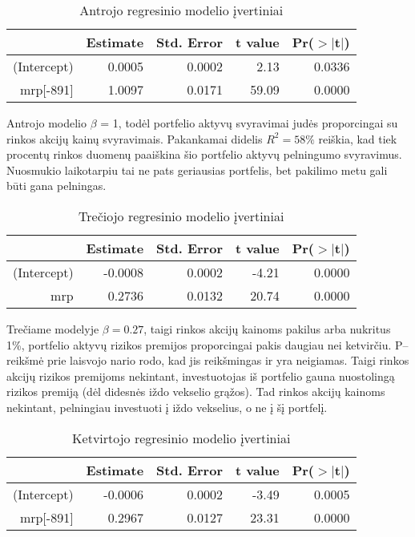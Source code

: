 \documentclass[12pt, a14paper, lithuanian]{article}
\begin{document}
\begin{table}[ht]
\begin{center}
\begin{tabular}{rrrrr}
\hline
& Estimate & Std. Error & t value & Pr($>$$|$t$|$) \\
\hline
(Intercept) & 0.0005 & 0.0002 & 2.13 & 0.0336 \\
mrp[-891] & 1.0097 & 0.0171 & 59.09 & 0.0000 \\
\hline
\end{tabular}
\end{center}
\caption{Antrojo regresinio modelio įvertiniai}
\end{table}

Antrojo modelio $\beta$ = 1, todėl portfelio aktyvų svyravimai judės proporcingai su rinkos akcijų kainų svyravimais.
Pakankamai didelis $R^2=58\%$ reiškia, kad tiek procentų rinkos duomenų paaiškina šio portfelio aktyvų pelningumo
svyravimus. Nuosmukio laikotarpiu tai ne pats geriausias portfelis, bet pakilimo metu gali būti gana pelningas.



\begin{table}[ht]
\begin{center}
\begin{tabular}{rrrrr}
\hline
& Estimate & Std. Error & t value & Pr($>$$|$t$|$) \\
\hline
(Intercept) & -0.0008 & 0.0002 & -4.21 & 0.0000 \\
mrp & 0.2736 & 0.0132 & 20.74 & 0.0000 \\
\hline
\end{tabular}
\end{center}
\caption{Trečiojo regresinio modelio įvertiniai}
\end{table}

Trečiame modelyje $\beta=0.27$, taigi rinkos akcijų kainoms pakilus arba nukritus 1\%, portfelio aktyvų rizikos premijos
proporcingai pakis daugiau nei ketvirčiu. P--reikšmė prie laisvojo nario rodo, kad jis reikšmingas ir yra 
neigiamas. Taigi rinkos akcijų rizikos premijoms nekintant, investuotojas iš portfelio gauna
nuostolingą rizikos premiją (dėl didesnės iždo vekselio grąžos). Tad rinkos akcijų kainoms nekintant,
pelningiau investuoti į iždo vekselius, o ne į šį portfelį.



\begin{table}[ht]
\begin{center}
\begin{tabular}{rrrrr}
\hline
& Estimate & Std. Error & t value & Pr($>$$|$t$|$) \\
\hline
(Intercept) & -0.0006 & 0.0002 & -3.49 & 0.0005 \\
mrp[-891] & 0.2967 & 0.0127 & 23.31 & 0.0000 \\
\hline
\end{tabular}
\end{center}
\caption{Ketvirtojo regresinio modelio įvertiniai}
\end{table}
\end{document}
